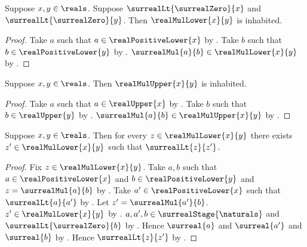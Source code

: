 \begin{proposition}\label{surreal_real_mul_lower_inhabited}
    Suppose $x,y\in\reals$.
    Suppose $\surrealLt{\surrealZero}{x}$ and
        $\surrealLt{\surrealZero}{y}$.
    Then $\realMulLower{x}{y}$ is inhabited.
\end{proposition}
\begin{proof}
    Take $a$ such that $a\in\realPositiveLower{x}$
        by .
    Take $b$ such that $b\in\realPositiveLower{y}$
        by .
    $\surrealMul{a}{b}\in\realMulLower{x}{y}$
        by .
\end{proof}

\begin{proposition}\label{surreal_real_mul_upper_inhabited}
    Suppose $x,y\in\reals$.
    Then $\realMulUpper{x}{y}$ is inhabited.
\end{proposition}
\begin{proof}
    Take $a$ such that $a\in\realUpper{x}$
        by .
    Take $b$ such that $b\in\realUpper{y}$
        by .
    $\surrealMul{a}{b}\in\realMulUpper{x}{y}$
        by .
\end{proof}

\begin{proposition}\label{surreal_real_mul_lower_no_maximum}
    Suppose $x,y\in\reals$.
    Then for every $z\in\realMulLower{x}{y}$ there exists
        $z'\in\realMulLower{x}{y}$ such that $\surrealLt{z}{z'}$.
\end{proposition}
\begin{proof}
    Fix $z\in\realMulLower{x}{y}$.
    Take $a,b$ such that
        $a\in\realPositiveLower{x}$ and
        $b\in\realPositiveLower{y}$ and
        $z=\surrealMul{a}{b}$
        by .
    Take $a'\in\realPositiveLower{x}$ such that
        $\surrealLt{a}{a'}$
        by .
    Let $z'=\surrealMul{a'}{b}$.
    $z'\in\realMulLower{x}{y}$
        by .
    $a,a',b\in\surrealStage{\naturals}$ and
        $\surrealLt{\surrealZero}{b}$
        by .
    Hence $\surreal{a}$ and $\surreal{a'}$ and $\surreal{b}$
        by
        .
    Hence $\surrealLt{z}{z'}$
        by .
\end{proof}

